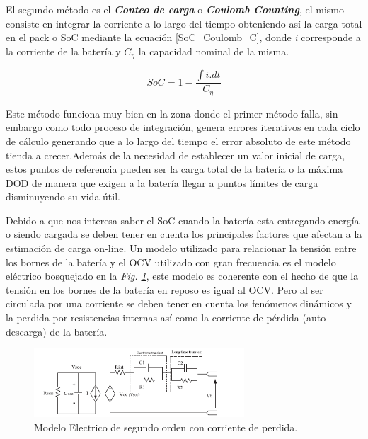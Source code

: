 \documentclass[10pt,a4paper]{article}
\begin{document}
	\noindent El segundo método es el \textbf{\emph{Conteo de carga}} o 
    \textbf{\emph{Coulomb Counting}}, el mismo consiste en integrar la corriente 
    a lo largo del tiempo obteniendo así la carga total en el pack o SoC 
    mediante la ecuación \ref{SoC_Coulomb_C}, donde \emph{i} corresponde a la 
    corriente de la batería y $C_\eta$ la capacidad nominal de la misma.
	
	\begin{figure}[h!]
		\begin{center}
			\begin{equation}
				SoC=1-\frac{\int{i.dt}}{C_\eta}\label{SoC_Coulomb_C}
			\end{equation}	
		\end{center}
	\end{figure}
	
	\noindent Este método funciona muy bien en la zona donde el primer método 
    falla, sin embargo como todo proceso de integración, genera errores 
    iterativos en cada ciclo de cálculo generando que a lo largo del tiempo el 
    error absoluto de este método tienda a crecer.Además de la necesidad de 
    establecer un valor inicial de carga, estos puntos de referencia pueden ser 
    la carga total de la batería o la máxima DOD de manera que exigen a la 
    batería llegar a puntos límites de carga disminuyendo su vida útil.
	
	\noindent Debido a que nos interesa saber el SoC cuando la batería esta 
    entregando energía o siendo cargada se deben tener en cuenta los principales 
    factores que afectan a la estimación de carga on-line. Un modelo utilizado 
    para relacionar la tensión entre los bornes de la batería y el OCV utilizado 
    con gran frecuencia es el modelo eléctrico bosquejado en la 
    \emph{Fig. \ref{Electric_model}}, este modelo es coherente con el hecho de 
    que la tensión en los bornes de la batería en reposo es igual al OCV. 
    Pero al ser circulada por una corriente se deben tener en cuenta los 
    fenómenos dinámicos y la perdida por resistencias internas así como la 
    corriente de pérdida (auto descarga) de la batería.
	
	\begin{figure}[ht]
		\begin{center}
			\includegraphics[width=0.7\textwidth]{electric_battery_model_2_order.png}
			\caption{Modelo Electrico de segundo orden con corriente de perdida.}
			\label{Electric_model}
		\end{center}
	\end{figure}
\end{document}
